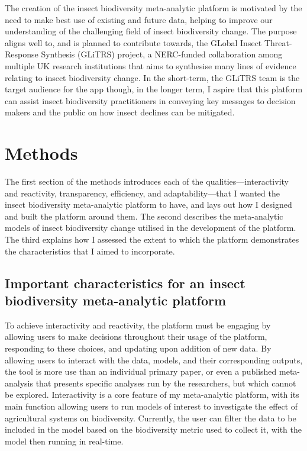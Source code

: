 \documentclass[11pt]{article}
\begin{document}
		\noindent The creation of the insect biodiversity meta-analytic platform is motivated by the need to make best use of existing and future data, helping to improve our understanding of the challenging field of insect biodiversity change. The purpose aligns well to, and is planned to contribute towards, the GLobal Insect Threat-Response Synthesis (GLiTRS) project, a NERC-funded collaboration among multiple UK research institutions that aims to synthesise many lines of evidence relating to insect biodiversity change. In the short-term, the GLiTRS team is the target audience for the app though, in the longer term, I aspire that this platform can assist insect biodiversity practitioners in conveying key messages to decision makers and the public on how insect declines can be mitigated.
	
	\clearpage 
	
	\section{Methods}
		The first section of the methods introduces each of the qualities—interactivity and reactivity, transparency, efficiency, and adaptability—that I wanted the insect biodiversity meta-analytic platform to have, and lays out how I designed and built the platform around them. The second describes the meta-analytic models of insect biodiversity change utilised in the development of the platform. The third explains how I assessed the extent to which the platform demonstrates the characteristics that I aimed to incorporate. 
		
		\subsection{Important characteristics for an insect biodiversity meta-analytic platform}
			To achieve interactivity and reactivity, the platform must be engaging by allowing users to make decisions throughout their usage of the platform, responding to these choices, and updating upon addition of new data. By allowing users to interact with the data, models, and their corresponding outputs, the tool is more use than an individual primary paper, or even a published meta-analysis that presents specific analyses run by the researchers, but which cannot be explored. Interactivity is a core feature of my meta-analytic platform, with its main function allowing users to run models of interest to investigate the effect of agricultural systems on biodiversity. Currently, the user can filter the data to be included in the model based on the biodiversity metric used to collect it, with the model then running in real-time. 
			
\end{document}
